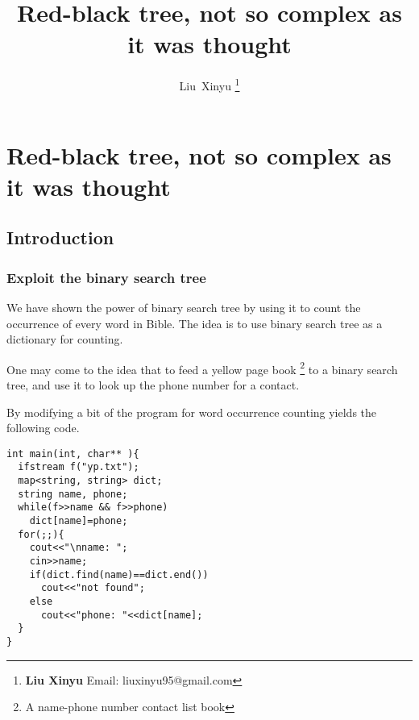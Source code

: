 \documentclass{article}
\begin{document}
\fi


\title{Red-black tree, not so complex as it was thought}

\author{Liu~Xinyu
\thanks{{\bfseries Liu Xinyu } \newline
  Email: liuxinyu95@gmail.com \newline}
  }


\maketitle

\ifx\wholebook\relax
\chapter{Red-black tree, not so complex as it was thought}
\fi

\section{Introduction}
\label{introduction} 

\subsection{Exploit the binary search tree}
We have shown the power of binary search tree by using it to count
the occurrence of every word in Bible. The idea is to use binary
search tree as a dictionary for counting.

One may come to the idea that to feed a yellow page book
\footnote{A name-phone number contact list book} to a binary
search tree, and use it to look up the phone number for a contact.

By modifying a bit of the program for word occurrence counting
yields the following code.

\begin{lstlisting}
int main(int, char** ){
  ifstream f("yp.txt");
  map<string, string> dict;
  string name, phone;
  while(f>>name && f>>phone)
    dict[name]=phone;
  for(;;){
    cout<<"\nname: ";
    cin>>name;
    if(dict.find(name)==dict.end())
      cout<<"not found";
    else
      cout<<"phone: "<<dict[name];
  }
}
\end{lstlisting}
\end{document}
